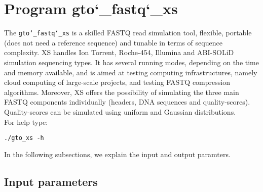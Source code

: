 \section{Program gto\char`_fastq\char`_xs}
The \texttt{gto\char`_fastq\char`_xs} is a skilled FASTQ read simulation tool, flexible, portable (does not need a reference sequence) and tunable in terms of sequence complexity. XS handles Ion Torrent, Roche-454, Illumina and ABI-SOLiD simulation sequencing types. It has several running modes, depending on the time and memory available, and is aimed at testing computing infrastructures, namely cloud computing of large-scale projects, and testing FASTQ compression algorithms. Moreover, XS offers the possibility of simulating the three main FASTQ components individually (headers, DNA sequences and quality-scores). Quality-scores can be simulated using uniform and Gaussian distributions.\\
For help type:
\begin{lstlisting}
./gto_xs -h
\end{lstlisting}
In the following subsections, we explain the input and output paramters.

\subsection*{Input parameters}

